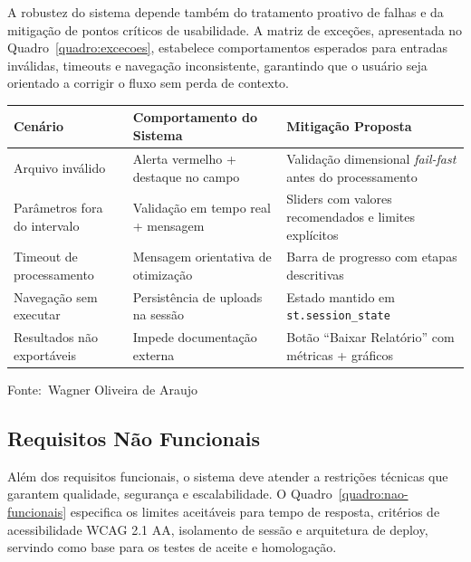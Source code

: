 \documentclass[12pt,a4paper]{article}
\newcommand{\oautor}{Wagner Oliveira de Araujo}
\begin{document}
A robustez do sistema depende também do tratamento proativo de falhas e da mitigação de pontos críticos de usabilidade. A matriz de exceções, apresentada no Quadro~\ref{quadro:excecoes}, estabelece comportamentos esperados para entradas inválidas, timeouts e navegação inconsistente, garantindo que o usuário seja orientado a corrigir o fluxo sem perda de contexto.

\begin{quadro}[ht]
\centering
\small
\caption{Tratamento de exceções e usabilidade}
\label{quadro:excecoes}
\begin{threeparttable}
\begin{tabularx}{\textwidth}{|l|X|X|} \hline
\textbf{Cenário} & \textbf{Comportamento do Sistema} & \textbf{Mitigação Proposta} \\ \hline
Arquivo inválido & Alerta vermelho + destaque no campo & Validação dimensional \textit{fail-fast} antes do processamento \\ \hline
Parâmetros fora do intervalo & Validação em tempo real + mensagem & Sliders com valores recomendados e limites explícitos \\ \hline
Timeout de processamento & Mensagem orientativa de otimização & Barra de progresso com etapas descritivas \\ \hline
Navegação sem executar & Persistência de uploads na sessão & Estado mantido em \texttt{st.session\_state} \\ \hline
Resultados não exportáveis & Impede documentação externa & Botão ``Baixar Relatório'' com métricas + gráficos \\ \hline
\end{tabularx}
\begin{tablenotes}[flushleft]
\footnotesize
\item Fonte:~\oautor
\end{tablenotes}
\end{threeparttable}
\end{quadro}

\subsection{Requisitos Não Funcionais}

Além dos requisitos funcionais, o sistema deve atender a restrições técnicas que garantem qualidade, segurança e escalabilidade. O Quadro~\ref{quadro:nao-funcionais} especifica os limites aceitáveis para tempo de resposta, critérios de acessibilidade WCAG 2.1 AA, isolamento de sessão e arquitetura de deploy, servindo como base para os testes de aceite e homologação.
\end{document}
